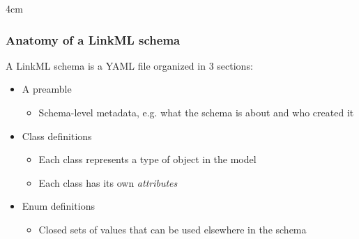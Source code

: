 \begin{frame}
\begin{overlayarea}{\textwidth}{4cm}
  \end{overlayarea}

\end{frame}

\begin{frame}
  \frametitle{Anatomy of a LinkML schema}

  A LinkML schema is a YAML file organized in 3 sections:
  \begin{itemize}
    \item A preamble
      \begin{itemize}
        \item Schema-level metadata, e.g. what the schema is about and who
              created it
      \end{itemize}
    \item Class definitions
      \begin{itemize}
        \item Each class represents a type of object in the model
        \item Each class has its own \emph{attributes}
      \end{itemize}
    \item Enum definitions
      \begin{itemize}
        \item Closed sets of values that can be used elsewhere in the schema
      \end{itemize}
  \end{itemize}
\end{frame}


